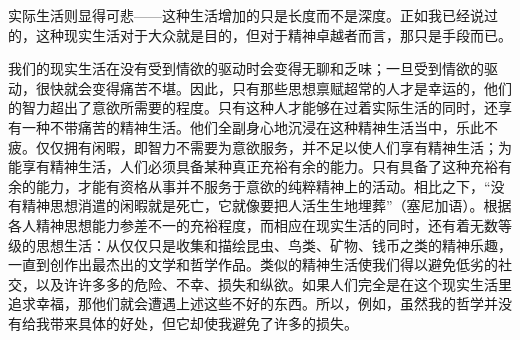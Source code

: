 \documentclass[12pt,oneside]{book}
\begin{document}
实际生活则显得可悲——这种生活增加的只是长度而不是深度。正如我已经说过的，这种现实生活对于大众就是目的，但对于精神卓越者而言，那只是手段而已。 

我们的现实生活在没有受到情欲的驱动时会变得无聊和乏味；一旦受到情欲的驱动，很快就会变得痛苦不堪。因此，只有那些思想禀赋超常的人才是幸运的，他们的智力超出了意欲所需要的程度。只有这种人才能够在过着实际生活的同时，还享有一种不带痛苦的精神生活。他们全副身心地沉浸在这种精神生活当中，乐此不疲。仅仅拥有闲暇，即智力不需要为意欲服务，并不足以使人们享有精神生活；为能享有精神生活，人们必须具备某种真正充裕有余的能力。只有具备了这种充裕有余的能力，才能有资格从事并不服务于意欲的纯粹精神上的活动。相比之下，“没有精神思想消遣的闲暇就是死亡，它就像要把人活生生地埋葬”（塞尼加语）。根据各人精神思想能力参差不一的充裕程度，而相应在现实生活的同时，还有着无数等级的思想生活：从仅仅只是收集和描绘昆虫、鸟类、矿物、钱币之类的精神乐趣，一直到创作出最杰出的文学和哲学作品。类似的精神生活使我们得以避免低劣的社交，以及许许多多的危险、不幸、损失和纵欲。如果人们完全是在这个现实生活里追求幸福，那他们就会遭遇上述这些不好的东西。所以，例如，虽然我的哲学并没有给我带来具体的好处，但它却使我避免了许多的损失。 
\end{document}
